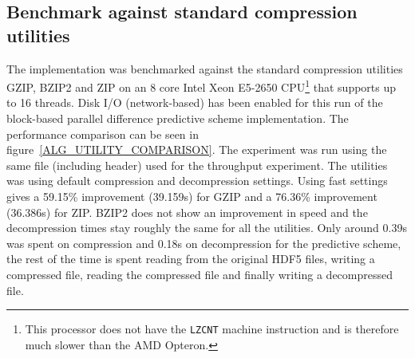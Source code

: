 \subsection{Benchmark against standard compression utilities}
The implementation was benchmarked against the standard compression utilities GZIP, BZIP2 and ZIP on an 8 core Intel Xeon E5-2650 CPU\footnote{This processor does not have 
the \texttt{LZCNT} machine instruction and is therefore much slower than the AMD Opteron.} that supports up to 16 threads. 
Disk I/O (network-based) has been enabled for this run of the block-based parallel difference predictive scheme implementation. The performance comparison can be seen
in figure~\ref{ALG_UTILITY_COMPARISON}. The experiment was run using the same file (including header) used for the throughput experiment. The utilities was using default compression 
and decompression settings. Using fast settings gives a 59.15\% improvement (39.159s) for GZIP and a 76.36\% improvement (36.386s) for ZIP. BZIP2 does not show an improvement 
in speed and the decompression times stay roughly the same for all the utilities.  Only around 0.39s was spent on compression and 0.18s on decompression for the predictive scheme, 
the rest of the time is spent reading from the original HDF5 files, writing a compressed file, reading the compressed file and finally writing a decompressed file.
